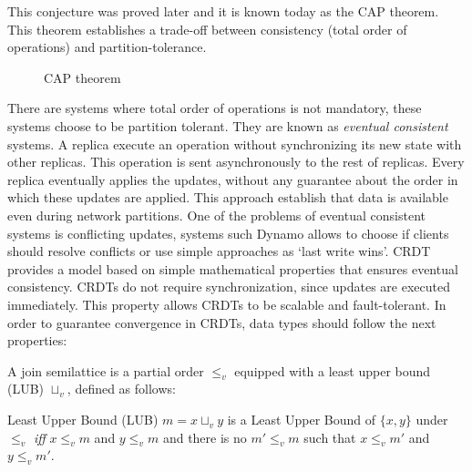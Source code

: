 This conjecture was proved\cite{capprove} later and it is known today as the CAP
theorem. This theorem establishes a trade-off between consistency (total order
of operations) and partition-tolerance.

\begin{figure}[!h]
  \centering
{}
\caption{CAP theorem}
\end{figure}

There are systems where total order of operations is not mandatory, these systems
choose to be partition tolerant. They are known as \textit{eventual consistent}
systems. A replica execute an operation without synchronizing its new state with
other replicas. This operation is sent asynchronously to the rest of replicas.
Every replica eventually applies the updates, without any guarantee about the
order in which these updates are applied. This approach establish that data is
available even during network partitions. One of the problems of eventual
consistent systems is conflicting updates, systems such Dynamo\cite{dynamo}
allows to choose if clients should resolve conflicts or use simple approaches as
`last write wins'. \acf{CRDT} provides a model based on simple mathematical
properties that ensures eventual consistency. \acs{CRDT}s do not require
synchronization, since updates are executed immediately. This property
allows \acs{CRDT}s to be scalable and fault-tolerant. In order to guarantee
convergence in \acs{CRDT}s, data types should follow the next properties:

A join semilattice\cite{book:lattices} is a partial order $\leq_{v}$ equipped with a
least upper bound (LUB) $\sqcup_v$, defined as follows:

\begin{definition}{Least Upper Bound (LUB)}
  $m = x \sqcup_v y$ is a Least Upper Bound of $\{x, y\}$ under $\leq_{v}$ \textit{iff}
  $x\leq_{v}m$ and $y\leq_{v}m$ and there is no $m'\leq_{v}m$ such that $x\leq_{v}m'$ and $y\leq_{v}m'$.
\end{definition}

